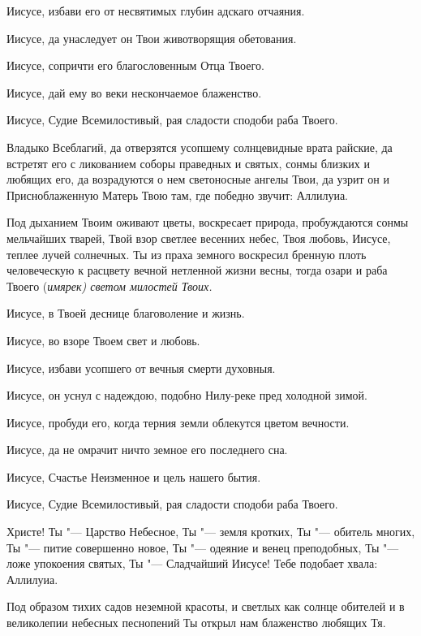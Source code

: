 Иисусе, избави его от несвятимых глубин адскаго отчаяния. 

Иисусе, да унаследует он Твои животворящия обетования. 

Иисусе, сопричти его благословенным Отца Твоего. 

Иисусе, дай ему во веки нескончаемое блаженство. 

Иисусе, Судие Всемилостивый, рая сладости сподоби раба Твоего.




Владыко Всеблагий, да отверзятся усопшему солнцевидные врата райские, да встретят его с ликованием соборы праведных и святых, сонмы близких и любящих его, да возрадуются о нем светоносные ангелы Твои, да узрит он и Присноблаженную Матерь Твою там, где победно звучит: Аллилуиа.




Под дыханием Твоим оживают цветы, воскресает природа, пробуждаются сонмы мельчайших тварей, Твой взор светлее весенних небес, Твоя любовь, Иисусе, теплее лучей солнечных. Ты из праха земного воскресил бренную плоть человеческую к расцвету вечной нетленной жизни весны, тогда озари и раба Твоего (\itshape имярек\normalfont{}) светом милостей Твоих. 

Иисусе, в Твоей деснице благоволение и жизнь. 

Иисусе, во взоре Твоем свет и любовь. 

Иисусе, избави усопшего от вечныя смерти духовныя. 

Иисусе, он уснул с надеждою, подобно Нилу-реке пред холодной зимой. 

Иисусе, пробуди его, когда терния земли облекутся цветом вечности. 

Иисусе, да не омрачит ничто земное его последнего сна. 

Иисусе, Счастье Неизменное и цель нашего бытия. 

Иисусе, Судие Всемилостивый, рая сладости сподоби раба Твоего.




Христе! Ты "--- Царство Небесное, Ты "--- земля кротких, Ты "--- обитель многих, Ты "--- питие совершенно новое, Ты "--- одеяние и венец преподобных, Ты "--- ложе упокоения святых, Ты "--- Сладчайший Иисусе! Тебе подобает хвала: Аллилуиа.




Под образом тихих садов неземной красоты, и светлых как солнце обителей и в великолепии небесных песнопений Ты открыл нам блаженство любящих Тя. 

